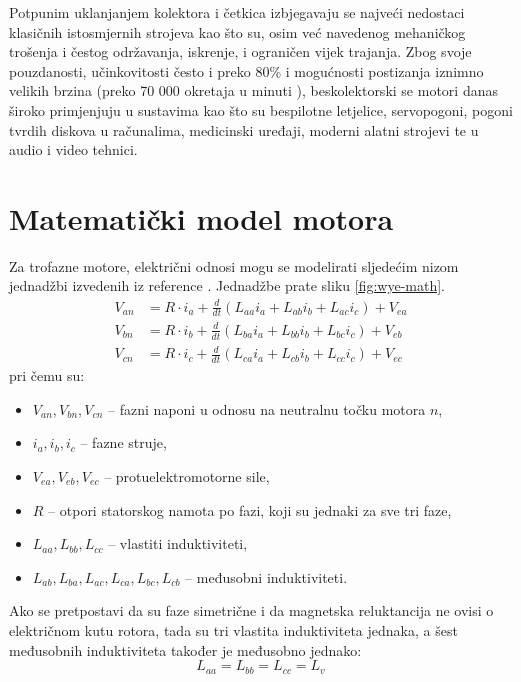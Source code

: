 \documentclass[diplomskirad]{fer}
\begin{document}
Potpunim uklanjanjem kolektora i četkica izbjegavaju se najveći nedostaci
klasičnih istosmjernih strojeva kao što su, osim već navedenog mehaničkog
trošenja i čestog održavanja, iskrenje, i ograničen vijek trajanja. Zbog svoje
pouzdanosti, učinkovitosti često i preko 80\% \cite{motor-ucinkovitost} i
mogućnosti postizanja iznimno velikih brzina (preko 70 000 okretaja u minuti
\cite{motor-rpm}), beskolektorski se motori danas široko primjenjuju u
sustavima kao što su bespilotne letjelice, servopogoni, pogoni tvrdih diskova u
računalima, medicinski uređaji, moderni alatni strojevi te u audio i video
tehnici.

\newpage

\section{Matematički model motora}
\label{sec:mat_model}
Za trofazne motore, električni odnosi mogu se modelirati sljedećim nizom jednadžbi izvedenih iz reference \cite{}. Jednadžbe prate sliku \ref{fig:wye-math}.
\begin{align}
	V_{an} & = R \cdot i_a + \frac{d}{dt}(L_{aa}i_a + L_{ab}i_b + L_{ac}i_c) + V_{ea} \\
	V_{bn} & = R \cdot i_b + \frac{d}{dt}(L_{ba}i_a + L_{bb}i_b + L_{bc}i_c) + V_{eb} \\
	V_{cn} & = R \cdot i_c + \frac{d}{dt}(L_{ca}i_a + L_{cb}i_b + L_{cc}i_c) + V_{ec}
\end{align}
pri čemu su:
\begin{itemize}
	\item $V_{an}, V_{bn}, V_{cn}$ -- fazni naponi u odnosu na neutralnu točku motora $n$,
	\item $i_a, i_b, i_c$ -- fazne struje,
	\item $V_{ea}, V_{eb}, V_{ec}$ -- protuelektromotorne sile,
	\item $R$ -- otpori statorskog namota po fazi, koji su jednaki za sve tri faze,
	\item $L_{aa}, L_{bb}, L_{cc}$ -- vlastiti induktiviteti,
	\item $L_{ab}, L_{ba}, L_{ac}, L_{ca}, L_{bc}, L_{cb}$ -- međusobni induktiviteti.
\end{itemize}
Ako se pretpostavi da su faze simetrične i da magnetska reluktancija ne ovisi o
električnom kutu rotora, tada su tri vlastita induktiviteta jednaka, a šest
međusobnih induktiviteta također je međusobno jednako:
\begin{equation}
	L_{aa} = L_{bb} = L_{cc} = L_v \tag{2.4}
\end{equation}
\end{document}
